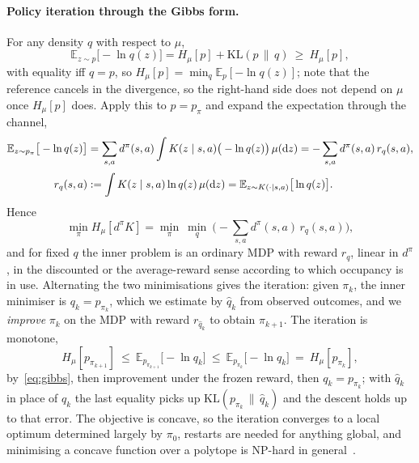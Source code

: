 \documentclass[11pt]{article}
\theoremstyle{remark}
\newcommand{\E}{\mathbb E}
\newcommand{\1}{\mathds{1}}
\newcommand{\dd}{\mathrm d}
\newcommand{\occ}{d^{\pi}}
\newcommand{\pz}{p_{\pi}}
\newcommand{\Hf}[1]{H_{\mu}\!\left[#1\right]}
\newcommand{\KL}{\mathrm{KL}}
\begin{document}
\paragraph{Policy iteration through the Gibbs form.}
For any density $q$ with respect to $\mu$,
\begin{equation}
  \E_{z\sim p}\big[-\ln q(z)\big]=\Hf{p}+\KL(p\,\|\,q)\ \ge\ \Hf{p},
  \label{eq:gibbs}
\end{equation}
with equality iff $q=p$, so $\Hf{p}=\min_q\E_{p}[-\ln q(z)]$; note that the reference cancels in the divergence, so the right-hand side does not depend on $\mu$ once $\Hf{p}$ does.
Apply this to $p=\pz$ and expand the expectation through the channel,
\begin{align}
  \E_{z\sim\pz}\big[-\ln q(z)\big]
  &=\sum_{s,a}\occ(s,a)\int K(z\mid s,a)\big(-\ln q(z)\big)\,\mu(\dd z)=-\sum_{s,a}\occ(s,a)\,r_q(s,a),
  \label{eq:gibbs-reward}\\[2pt]
  r_q(s,a)
  &:=\int K(z\mid s,a)\ln q(z)\,\mu(\dd z)=\E_{z\sim K(\cdot\mid s,a)}\big[\ln q(z)\big] . \notag
\end{align}
Hence
\begin{equation}
  \min_{\pi}\Hf{\occ K}=\min_{\pi}\ \min_{q}\ \Big(-\sum_{s,a}\occ(s,a)\,r_q(s,a)\Big),
  \label{eq:min-min}
\end{equation}
and for fixed $q$ the inner problem is an ordinary MDP with reward $r_q$, linear in $\occ$, in the discounted or the average-reward sense according to which occupancy is in use.
Alternating the two minimisations gives the iteration: given $\pi_k$, the inner minimiser is $q_k=p_{\pi_k}$, which we estimate by $\hat q_k$ from observed outcomes, and we \emph{improve} $\pi_k$ on the MDP with reward $r_{\hat q_k}$ to obtain $\pi_{k+1}$.
The iteration is monotone,
\begin{equation}
  \Hf{p_{\pi_{k+1}}}
  \ \le\ \E_{p_{\pi_{k+1}}}\big[-\ln q_k\big]
  \ \le\ \E_{p_{\pi_k}}\big[-\ln q_k\big]
  \ =\ \Hf{p_{\pi_k}},
  \label{eq:mm-descent}
\end{equation}
by~\eqref{eq:gibbs}, then improvement under the frozen reward, then $q_k=p_{\pi_k}$; with $\hat q_k$ in place of $q_k$ the last equality picks up $\KL(p_{\pi_k}\,\|\,\hat q_k)$ and the descent holds up to that error.
The objective is concave, so the iteration converges to a local optimum determined largely by $\pi_0$, restarts are needed for anything global, and minimising a concave function over a polytope is NP-hard in general~\citep{Pardalos-quadratic91}.
\end{document}

